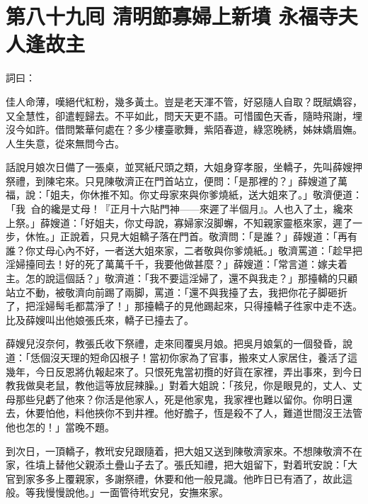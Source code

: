 
\chapter*{第八十九囘 清明節寡婦上新墳 永福寺夫人逢故主}


詞曰：

\begin{myquote}
佳人命薄，嘆絕代紅粉，幾多黃土。豈是老天渾不管，好惡隨人自取？既賦嬌容，又全慧性，卻遣輕歸去。不平如此，問天天更不語。可惜國色天香，隨時飛謝，埋沒今如許。借問繁華何處在？多少樓臺歌舞，紫陌春遊，綠窓晚綉，姊妹嬌眉嫵。人生失意，從來無問今古。

\end{myquote}

話說月娘次日備了一張桌，並冥紙尺頭之類，大姐身穿孝服，坐轎子，先叫薛嫂押祭禮，到陳宅來。只見陳敬濟正在門首站立，便問：「是那裡的？」薛嫂道了萬福，說：「姐夫，你休推不知。你丈母家來與你爹燒紙，送大姐來了。」{}敬濟便道：「我𩫻𩫵㒲的纔是丈母！{}『正月十六貼門神——來遲了半個月』。人也入了土，纔來上祭。」薛嫂道：「好姐夫，你丈母說，寡婦家沒脚蠏，不知親家靈柩來家，遲了一步，休恠。」正說着，只見大姐轎子落在門首。敬濟問：「是誰？」薛嫂道：「再有誰？你丈母心內不好，一者送大姐來家，二者敬與你爹燒紙。」敬濟罵道：「趁早把淫婦擡囘去！好的死了萬萬千千，我要他做甚麼？」{}薛嫂道：「常言道：嫁夫着主。怎的說這個話？」敬濟道：「我不要這淫婦了，還不與我走？」那擡轎的只顧站立不動，被敬濟向前踢了兩脚，罵道：「還不與我擡了去，我把你花子脚砸折了，把淫婦髩毛都蒿淨了！」那擡轎子的見他踢起來，只得擡轎子徃家中走不迭。比及薛嫂叫出他娘張氏來，轎子已擡去了。

薛嫂兒沒奈何，教張氏收下祭禮，走來囘覆吳月娘。把吳月娘氣的一個發昏，說道：「恁個沒天理的短命囚根子！當初你家為了官事，搬來丈人家居住，養活了這幾年，今日反恩將仇報起來了。只恨死鬼當初攬的好貨在家裡，弄出事來，到今日教我做臭老鼠，教他這等放屁辣臊。」{}對着大姐說：「孩兒，你是眼見的，丈人、丈母那些兒虧了他來？你活是他家人，死是他家鬼，我家裡也難以留你。你明日還去，休要怕他，料他挾你不到井裡。他好膽子，恆是殺不了人，{}難道世間沒王法管他也怎的！」當晚不題。

到次日，一頂轎子，教玳安兒跟隨着，把大姐又送到陳敬濟家來。不想陳敬濟不在家，徃墳上替他父親添土疊山子去了。張氏知禮，把大姐留下，對着玳安說：「大官到家多多上覆親家，多謝祭禮，休要和他一般見識。他昨日已有酒了，故此這般。等我慢慢說他。」一面管待玳安兒，安撫來家。

